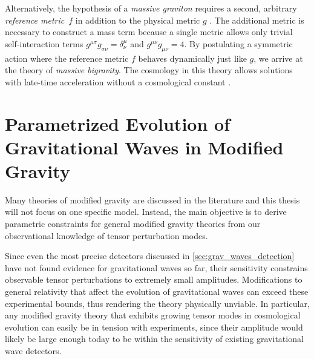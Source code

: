 Alternatively, the hypothesis of a \emph{massive graviton} requires a second, arbitrary \emph{reference metric}~\(f\) in addition to the physical metric \(g\) \autocite{deRham2014}. The additional metric is necessary to construct a mass term because a single metric allows only trivial self-interaction terms \(g^{\mu\sigma}g_{\sigma\nu}=\delta^\mu_\nu\) and \(g^{\mu\nu}g_{\mu\nu} = 4\). By postulating a symmetric action where the reference metric \(f\) behaves dynamically just like \(g\), we arrive at the theory of \emph{massive bigravity}.
The cosmology in this theory allows solutions with late-time acceleration without a cosmological constant \autocite{Akrami2013,Konnig2014}.



\chapter{Parametrized Evolution of Gravitational Waves in Modified Gravity}\label{ch:param_mod_grav}

Many theories of modified gravity are discussed in the literature \autocite{Clifton2012,Euclid2013,deRham2014} and this thesis will not focus on one specific model. Instead, the main objective is to derive parametric constraints for general modified gravity theories from our observational knowledge of tensor perturbation modes.

Since even the most precise detectors discussed in \autoref{sec:grav_waves_detection} have not found evidence for gravitational waves so far, their sensitivity constrains observable tensor perturbations to extremely small amplitudes. Modifications to general relativity that affect the evolution of gravitational waves can exceed these experimental bounds, thus rendering the theory physically unviable. In particular, any modified gravity theory that exhibits growing tensor modes in cosmological evolution can easily be in tension with experiments, since their amplitude would likely be large enough today to be within the sensitivity of existing gravitational wave detectors.

